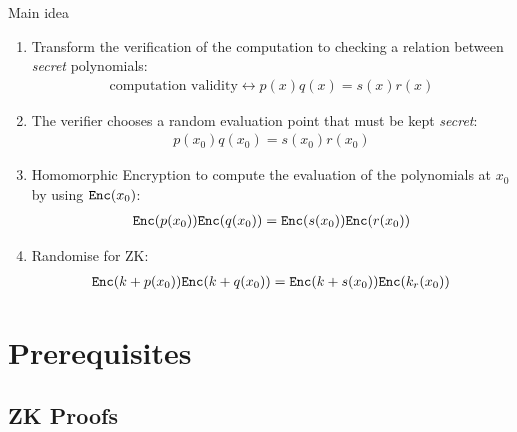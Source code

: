 \documentclass[handouts]{beamer}
\begin{document}
\begin{frame}{Main idea} 
\begin{tiny}
\begin{enumerate}
\item Transform the verification of the computation to checking a relation between \emph{secret} polynomials: 
\begin{align*}\textrm{computation validity} \leftrightarrow p(x)q(x)=s(x)r(x) \end{align*} \pause
\item The verifier chooses a random evaluation point that must be kept \emph{secret}: 
\begin{align*} p(x_0)q(x_0)=s(x_0)r(x_0) \end{align*} \pause
\item Homomorphic Encryption to compute the evaluation of the polynomials at $x_0$ by using $\mathtt{Enc}(x_0)$:
\begin{align*}\mathtt{Enc}(p(x_0))\mathtt{Enc}(q(x_0))=\mathtt{Enc}(s(x_0))\mathtt{Enc}(r(x_0))
\end{align*} \pause
\item Randomise for ZK:
\begin{align*}
\mathtt{Enc}(k+p(x_0))\mathtt{Enc}(k+q(x_0))   =\mathtt{Enc}(k+s(x_0))\mathtt{Enc}(k_ r(x_0))   
\end{align*}
\end{enumerate}
\end{tiny}
\end{frame}

\section{Prerequisites}

\subsection{ZK Proofs}
\end{document}
